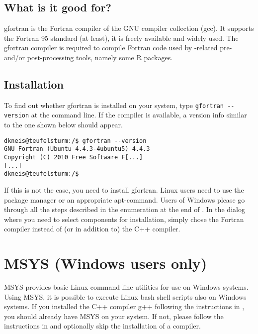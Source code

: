 \subsection{What is it good for?} \label{sec:extSoft:gfortran:why}
gfortran is the Fortran compiler of the GNU compiler collection (gcc). It supports the Fortran 95 standard (at least), it is freely available and widely used. The gfortran compiler is required to compile Fortran code used by -related pre- and/or post-processing tools, namely some R packages.

\subsection{Installation} \label{sec:extSoft:gfortran:basic}

To find out whether gfortran is installed on your system, type \verb!gfortran --version! at the command line. If the compiler is available, a version info similar to the one shown below should appear.
\begin{lstlisting}[style=shell]
dkneis@teufelsturm:/$ gfortran --version
GNU Fortran (Ubuntu 4.4.3-4ubuntu5) 4.4.3
Copyright (C) 2010 Free Software F[...]
[...]
dkneis@teufelsturm:/$
\end{lstlisting}

If this is not the case, you need to install gfortran. Linux users need to use the package manager or an appropriate apt-command. Users of Windows please go through all the steps described in the enumeration at the end of . In the dialog where you need to select components for installation, simply chose the Fortran compiler instead of (or in addition to) the C++ compiler.


\section{MSYS (Windows users only)} \label{sec:extSoft:msys}

MSYS provides basic Linux command line utilities for use on Windows systems. Using MSYS, it is possible to execute Linux bash shell scripts also on Windows systems. If you installed the C++ compiler g++ following the instructions in , you should already have MSYS on your system. If not, please follow the instructions in  and optionally skip the installation of a compiler.

